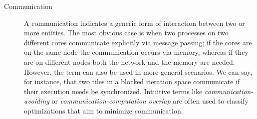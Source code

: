 \begin{description}
\item[Communication] A communication indicates a generic form of interaction between two or more entities. The most obvious case is when two processes on two different cores communicate explicitly via message passing; if the cores are on the same node the communication occurs via memory, whereas if they are on different nodes both the network and the memory are needed. However, the term can also be used in more general scenarios. We can say, for instance, that two tiles in a blocked iteration space communicate if their execution needs be synchronized. Intuitive terms like {\em communication-avoiding} or {\em communication-computation overlap} are often used to classify optimizations that aim to minimize communication. 

\end{description}


